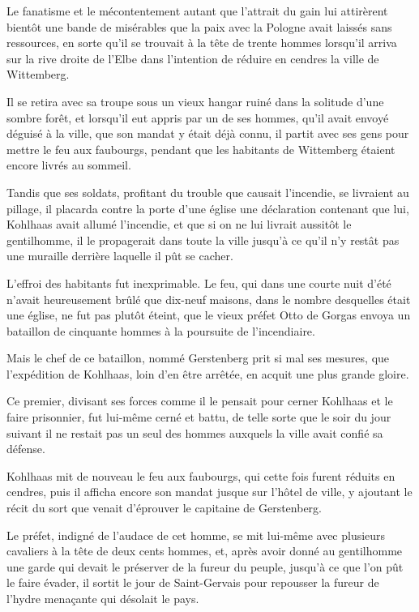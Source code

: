 \documentclass[french,twoside]{book} %
\begin{document}
Le fanatisme et le mécontentement autant que l’attrait du gain lui attirèrent bientôt une bande de misérables que la paix avec la Pologne avait laissés sans ressources, en sorte qu’il se trouvait à la tête de trente hommes lorsqu’il arriva sur la rive droite de l’Elbe dans l’intention de réduire en cendres la ville de Wittemberg.\par
Il se retira avec sa troupe sous un vieux hangar ruiné dans la solitude d’une sombre forêt, et lorsqu’il eut appris par un de ses hommes, qu’il avait envoyé déguisé à la ville, que son mandat y était déjà connu, il partit avec ses gens pour mettre le feu aux faubourgs, pendant que les habitants de Wittemberg étaient encore livrés au sommeil.\par
Tandis que ses soldats, profitant du trouble que causait l’incendie, se livraient au pillage, il placarda contre la porte d’une église une déclaration contenant que lui, Kohlhaas avait allumé l’incendie, et que si on ne lui livrait aussitôt le gentilhomme, il le propagerait dans toute la ville jusqu’à ce qu’il n’y restât pas une muraille derrière laquelle il pût se cacher.\par
L’effroi des habitants fut inexprimable. Le feu, qui dans une courte nuit d’été n’avait heureusement brûlé que dix-neuf maisons, dans le nombre desquelles était une église, ne fut pas plutôt éteint, que le vieux préfet Otto de Gorgas envoya un bataillon de cinquante hommes à la poursuite de l’incendiaire.\par
Mais le chef de ce bataillon, nommé Gerstenberg prit si mal ses mesures, que l’expédition de Kohlhaas, loin d’en être arrêtée, en acquit une plus grande gloire.\par
Ce premier, divisant ses forces comme il le pensait pour cerner Kohlhaas et le faire prisonnier, fut lui-même cerné et battu, de telle sorte que le soir du jour suivant il ne restait pas un seul des hommes auxquels la ville avait confié sa défense.\par
Kohlhaas mit de nouveau le feu aux faubourgs, qui cette fois furent réduits en cendres, puis il afficha encore son mandat jusque sur l’hôtel de ville, y ajoutant le récit du sort que venait d’éprouver le capitaine de Gerstenberg.\par
Le préfet, indigné de l’audace de cet homme, se mit lui-même avec plusieurs cavaliers à la tête de deux cents hommes, et, après avoir donné au gentilhomme une garde qui devait le préserver de la fureur du peuple, jusqu’à ce que l’on pût le faire évader, il sortit le jour de Saint-Gervais pour repousser la fureur de l’hydre menaçante qui désolait le pays.\par
\end{document}
